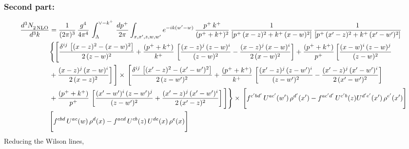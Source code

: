\documentclass[9pt]{article}
\numberwithin{equation}{section}
\begin{document}
\subsubsection{Second part:\,}
\begin{align}
    \frac{d^{3}N_{2\,\rm NLO}^{\rm}}{d^{3}k}  & = \frac{1}{(2\pi)^{3}}\, \frac{g^{4}}{4\pi^{4}}\,\int_{\Lambda}^{\vee-k^{+}}\, \frac{dp^{+}}{2\pi}\int_{x,x',z,w,w^{\prime}} e^{-ik(w^{\prime}-w)}\,\frac{p^{+}\,k^{+}}{(p^{+}+k^{+})^{2}}\, \frac{1}{\left[p^{+}\,(x-z)^{2}+k^{+}\,(x-w)^{2}\right]}\,\frac{1}{\left[p^{+}\,(x'-z)^{2}+k^{+}\,(x'-w')^{2}\right]}\notag \\ & \Bigg\{\Bigg[\frac{\delta^{ij}\, \left[(x-z)^{2}-(x-w)^{2}\right]}{2\,(z-w)^{2}} + \frac{(p^{+}+k^{+})}{k^{+}}\, \left[\frac{(x-z)^{j}\,(z-w)^{i}}{(z-w)^{2}}-\frac{(x-z)^{j}\,(x-w)^{i}}{2\,(x-w)^{2}}\right]+\frac{(p^{+}+k^{+})}{p^{+}}\,\bigg[\frac{(x-w)^{i}\,(z-w)^{j}}{(z-w)^{2}}\notag \\ & +\frac{(x-z)^{j}\,(x-w)^{i}}{2\,(x-z)^{2}}\bigg]\,\Bigg]\times\, \Bigg[\frac{\delta^{ij}\, \left[(x'-z)^{2}-(x'-w')^{2}\right]}{2\,(z-w')^{2}}+ \frac{(p^{+}+k^{+})}{k^{+}}\, \left[\frac{(x'-z)^{j}\,(z-w')^{i}}{(z-w')^{2}}-\frac{(x'-z)^{j}\,(x'-w')^{i}}{2\,(x'-w')^{2}}\right]\notag \\ & +\frac{(p^{+}+k^{+})}{p^{+}}\,\left[\frac{(x'-w')^{i}\,(z-w')^{j}}{(z-w')^{2}} +\frac{(x'-z)^{j}\,(x'-w')^{i}}{2\,(x'-z)^{2}}\right] \Bigg] \Bigg\} \times\, \Bigg[f^{c'bd'}\, U^{ac'}(w')\,\rho^{d'}(x')-f^{ac'd'}\, U^{c'b}(z)U^{d'e'}(x')\, \rho^{e'}(x')\Bigg]\notag \\ & \Bigg[f^{cbd}\, U^{ac}(w)\,\rho^{d}(x) - f^{acd}\, U^{cb}(z)\,U^{de}(x)\, \rho^{e}(x)\Bigg]
\end{align}
Reducing the Wilson lines, 
\end{document}
